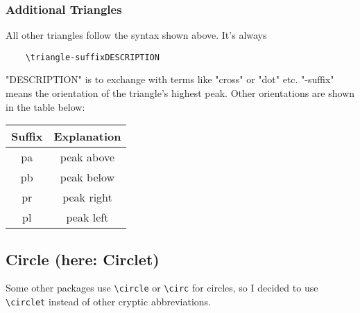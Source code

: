 \documentclass[
	a4paper,
	parskip=half,
    pagesize=auto,      		%
    listof=totoc,   		%
    bibliography=totoc,
	11pt
]{scrartcl}
\begin{document}
\subsubsection{Additional Triangles}

All other triangles follow the syntax shown above. It's always 

\begin{lstlisting}
	\triangle-suffixDESCRIPTION
\end{lstlisting}

"DESCRIPTION" is to exchange with terms like "cross" or "dot" etc. "-suffix" means the orientation of the triangle's highest peak. 
Other orientations are shown in the table below:


\begin{table}[H]
\centering
\begin{tabular}{|c|c|}
\hline
Suffix	&	Explanation	   \\ \hline \hline
pa & peak above \\ \hline
pb & peak below \\ \hline
pr & peak right \\ \hline
pl & peak left \\ \hline
\end{tabular}
\end{table}


\newpage
\subsection{Circle (here: Circlet)}

Some other packages use \lstinline{\circle} or \lstinline{\circ} for circles, so I decided to use \lstinline{\circlet} instead of other cryptic abbreviations.    
\end{document}
